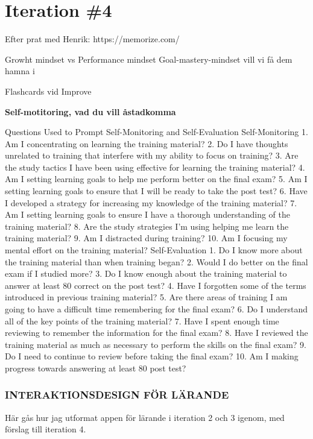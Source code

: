 \section{Iteration \#4}

Efter prat med Henrik:
https://memorize.com/

Growht mindset vs Performance mindset
Goal-mastery-mindset vill vi få dem hamna i

Flashcards vid Improve

\textbf{Self-motitoring, vad du vill åstadkomma}

Questions Used to Prompt Self-Monitoring and Self-Evaluation
Self-Monitoring
1. Am I concentrating on learning the training material?
2. Do I have thoughts unrelated to training that interfere with my ability to focus on training?
3. Are the study tactics I have been using effective for learning the training material?
4. Am I setting learning goals to help me perform better on the final exam?
5. Am I setting learning goals to ensure that I will be ready to take the post test?
6. Have I developed a strategy for increasing my knowledge of the training material?
7. Am I setting learning goals to ensure I have a thorough understanding of the training
material?
8. Are the study strategies I'm using helping me learn the training material?
9. Am I distracted during training?
10. Am I focusing my mental effort on the training material?
Self-Evaluation
1. Do I know more about the training material than when training began?
2. Would I do better on the final exam if I studied more?
3. Do I know enough about the training material to answer at least 80%
correct on the post test?
4. Have I forgotten some of the terms introduced in previous training material?
5. Are there areas of training I am going to have a difficult time remembering for the final
exam?
6. Do I understand all of the key points of the training material?
7. Have I spent enough time reviewing to remember the information for the final exam?
8. Have I reviewed the training material as much as necessary to perform the skills on the
final exam?
9. Do I need to continue to review before taking the final exam?
10. Am I making progress towards answering at least 80%
post test? 

\subsubsection{INTERAKTIONSDESIGN FÖR LÄRANDE}
Här gås hur jag utformat appen för lärande i iteration 2 och 3 igenom, med förslag till iteration 4.

